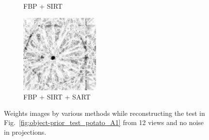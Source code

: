 \documentclass{article}
\begin{document}
\begin{figure}[!h]
\begin{subfigure}[b]{0.2\linewidth}
\captionsetup{labelformat=empty}
        \caption{FBP + SIRT}
    \end{subfigure}
    \quad
        \begin{subfigure}[b]{0.2\linewidth}
        \includegraphics[width=\textwidth]{../images/potato/artefacts/no_noise/weightsIm_fbp_sart_sirt30.png}
\captionsetup{labelformat=empty}
        \caption{FBP + SIRT + SART}
     \end{subfigure}
      \caption{Weights images by various methods while reconstructing the test in Fig.~\ref{fig:object-prior_test_potato_A1} from 12 views and no noise in projections.}
\label{fig:weights_no_noise}
\end{figure}
\end{document}
